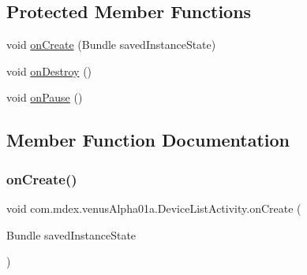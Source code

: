 \subsection*{Protected Member Functions}
\begin{DoxyCompactItemize}
\item 
void \hyperlink{classcom_1_1mdex_1_1venus_alpha01a_1_1_device_list_activity_a68db520123009e37a223fe9172008f7a}{on\+Create} (Bundle saved\+Instance\+State)
\item 
void \hyperlink{classcom_1_1mdex_1_1venus_alpha01a_1_1_device_list_activity_a17d25db1084b6c1e41b48ad82c4b494c}{on\+Destroy} ()
\item 
void \hyperlink{classcom_1_1mdex_1_1venus_alpha01a_1_1_device_list_activity_a625ec8ffcfdb2e1726616b0abc8d1684}{on\+Pause} ()
\end{DoxyCompactItemize}


\subsection{Member Function Documentation}
\mbox{\label{classcom_1_1mdex_1_1venus_alpha01a_1_1_device_list_activity_a68db520123009e37a223fe9172008f7a}} 
\subsubsection{\texorpdfstring{on\+Create()}{onCreate()}}
{\footnotesize\ttfamily void com.\+mdex.\+venus\+Alpha01a.\+Device\+List\+Activity.\+on\+Create (\begin{DoxyParamCaption}\item[{Bundle}]{saved\+Instance\+State }\end{DoxyParamCaption})\hspace{0.3cm}{\ttfamily [protected]}}

\mbox{\label{classcom_1_1mdex_1_1venus_alpha01a_1_1_device_list_activity_a17d25db1084b6c1e41b48ad82c4b494c}} 

